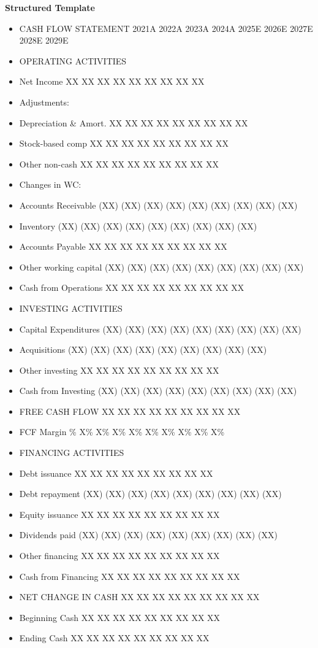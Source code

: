 \documentclass[11pt]{article}
\begin{document}
\textbf{Structured Template}
\begin{itemize}[leftmargin=*,itemsep=2pt,topsep=2pt]
\item {} CASH FLOW STATEMENT 2021A 2022A 2023A 2024A 2025E 2026E 2027E 2028E 2029E
\item {} OPERATING ACTIVITIES
\item {} Net Income XX XX XX XX XX XX XX XX XX
\item {} Adjustments:
\item {} Depreciation \& Amort. XX XX XX XX XX XX XX XX XX
\item {} Stock-based comp XX XX XX XX XX XX XX XX XX
\item {} Other non-cash XX XX XX XX XX XX XX XX XX
\item {} Changes in WC:
\item {} Accounts Receivable (XX) (XX) (XX) (XX) (XX) (XX) (XX) (XX) (XX)
\item {} Inventory (XX) (XX) (XX) (XX) (XX) (XX) (XX) (XX) (XX)
\item {} Accounts Payable XX XX XX XX XX XX XX XX XX
\item {} Other working capital (XX) (XX) (XX) (XX) (XX) (XX) (XX) (XX) (XX)
\item {} Cash from Operations XX XX XX XX XX XX XX XX XX
\item {} INVESTING ACTIVITIES
\item {} Capital Expenditures (XX) (XX) (XX) (XX) (XX) (XX) (XX) (XX) (XX)
\item {} Acquisitions (XX) (XX) (XX) (XX) (XX) (XX) (XX) (XX) (XX)
\item {} Other investing XX XX XX XX XX XX XX XX XX
\item {} Cash from Investing (XX) (XX) (XX) (XX) (XX) (XX) (XX) (XX) (XX)
\item {} FREE CASH FLOW XX XX XX XX XX XX XX XX XX
\item {} FCF Margin \% X\% X\% X\% X\% X\% X\% X\% X\% X\%
\item {} FINANCING ACTIVITIES
\item {} Debt issuance XX XX XX XX XX XX XX XX XX
\item {} Debt repayment (XX) (XX) (XX) (XX) (XX) (XX) (XX) (XX) (XX)
\item {} Equity issuance XX XX XX XX XX XX XX XX XX
\item {} Dividends paid (XX) (XX) (XX) (XX) (XX) (XX) (XX) (XX) (XX)
\item {} Other financing XX XX XX XX XX XX XX XX XX
\item {} Cash from Financing XX XX XX XX XX XX XX XX XX
\item {} NET CHANGE IN CASH XX XX XX XX XX XX XX XX XX
\item {} Beginning Cash XX XX XX XX XX XX XX XX XX
\item {} Ending Cash XX XX XX XX XX XX XX XX XX
\end{itemize}
\end{document}
